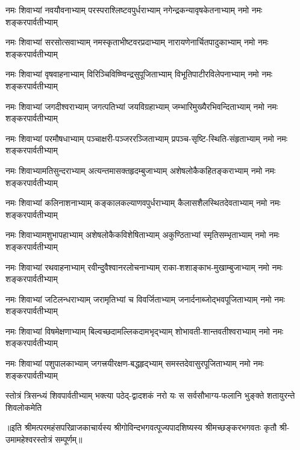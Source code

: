 

\fourlineindentedshloka
{नमः शिवाभ्यां नवयौवनाभ्याम्‌}
{परस्पराश्लिष्टवपुर्धराभ्याम्‌}
{नगेन्द्रकन्यावृषकेतनाभ्याम्‌}
{नमो नमः शङ्करपार्वतीभ्याम्‌}%

\fourlineindentedshloka
{नमः शिवाभ्यां सरसोत्सवाभ्याम्‌}
{नमस्कृताभीष्टवरप्रदाभ्याम्‌}
{नारायणेनार्चितपादुकाभ्याम्}
{नमो नमः शङ्करपार्वतीभ्याम्‌}%

\fourlineindentedshloka
{नमः शिवाभ्यां वृषवाहनाभ्याम्‌}
{विरिञ्चिविष्ण्विन्द्रसुपूजिताभ्याम्‌}
{विभूतिपाटीरविलेपनाभ्याम्‌}
{नमो नमः शङ्करपार्वतीभ्याम्‌}%

\fourlineindentedshloka
{नमः शिवाभ्यां जगदीश्वराभ्याम्}
{जगत्पतिभ्यां जयविग्रहाभ्याम्‌}
{जम्भारिमुख्यैरभिवन्दिताभ्याम्‌}
{नमो नमः शङ्करपार्वतीभ्याम्‌}%

\fourlineindentedshloka
{नमः शिवाभ्यां परमौषधाभ्याम्‌}
{पञ्चाक्षरी-पञ्जररञ्जिताभ्याम्‌}
{प्रपञ्च-सृष्टि-स्थिति-संहृताभ्याम्‌}
{नमो नमः शङ्करपार्वतीभ्याम्‌}%

\fourlineindentedshloka
{नमः शिवाभ्यामतिसुन्दराभ्याम्‌}
{अत्यन्तमासक्तहृदम्बुजाभ्याम्‌}
{अशेषलोकैकहितङ्कराभ्याम्‌}
{नमो नमः शङ्करपार्वतीभ्याम्‌}%

\fourlineindentedshloka
{नमः शिवाभ्यां कलिनाशनाभ्याम्‌}
{कङ्कालकल्याणवपुर्धराभ्याम्‌}
{कैलासशैलस्थितदेवताभ्याम्‌}
{नमो नमः शङ्करपार्वतीभ्याम्‌}%

\fourlineindentedshloka
{नमः शिवाभ्यामशुभापहाभ्याम्‌}
{अशेषलोकैकविशेषिताभ्याम्‌}
{अकुण्ठिताभ्यां स्मृतिसम्भृताभ्याम्‌}
{नमो नमः शङ्करपार्वतीभ्याम्‌}%

\fourlineindentedshloka
{नमः शिवाभ्यां रथवाहनाभ्याम्‌}
{रवीन्दुवैश्वानरलोचनाभ्याम्‌}
{राका-शशाङ्काभ-मुखाम्बुजाभ्याम्‌}
{नमो नमः शङ्करपार्वतीभ्याम्‌}%

\fourlineindentedshloka
{नमः शिवाभ्यां जटिलन्धराभ्याम्‌}
{जरामृतिभ्यां च विवर्जिताभ्याम्‌}
{जनार्दनाब्जोद्भवपूजिताभ्याम्‌}
{नमो नमः शङ्करपार्वतीभ्याम्‌}%

\fourlineindentedshloka
{नमः शिवाभ्यां विषमेक्षणाभ्याम्‌}
{बिल्वच्छदामल्लिकदामभृद्‌भ्याम्‌}
{शोभावती-शान्तवतीश्वराभ्याम्‌}
{नमो नमः शङ्करपार्वतीभ्याम्‌}%

\fourlineindentedshloka
{नमः शिवाभ्यां पशुपालकाभ्याम्‌}
{जगत्त्रयीरक्षण-बद्धहृद्‌भ्याम्‌}
{समस्तदेवासुरपूजिताभ्याम्‌}
{नमो नमः शङ्करपार्वतीभ्याम्‌}%

\fourlineindentedshloka
{स्तोत्रं त्रिसन्ध्यं शिवपार्वतीभ्याम्‌}
{भक्त्या पठेद्-द्वादशकं नरो यः}
{स सर्वसौभाग्य-फलानि भुङ्क्ते}
{शतायुरन्ते शिवलोकमेति}%

{॥इति श्रीमत्परमहंसपरिव्राजकाचार्यस्य श्रीगोविन्दभगवत्पूज्यपादशिष्यस्य 
श्रीमच्छङ्करभगवतः कृतौ श्री-उमामहेश्वरस्तोत्रं सम्पूर्णम्‌॥}